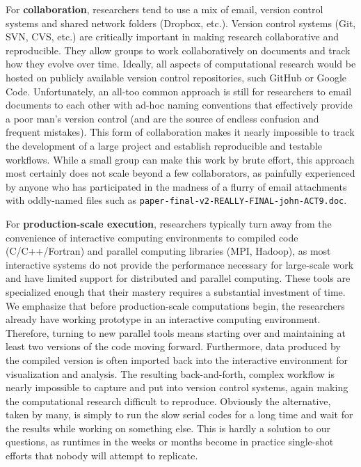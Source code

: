 \documentclass[ChapterTOCs,krantz2]{krantz} %
\begin{document}
For \textbf{collaboration}, researchers tend to use a mix of email, version
control systems and shared network folders (Dropbox, etc.).  Version control
systems (Git, SVN, CVS, etc.) are critically important in making research
collaborative and reproducible. They allow groups to work collaboratively on
documents and track how they evolve over time. Ideally, all aspects of
computational research would be hosted on publicly available version control
repositories, such GitHub or Google Code. Unfortunately, an all-too common
approach is still for researchers to email documents to each other with ad-hoc
naming conventions that effectively provide a poor man's version control (and
are the source of endless confusion and frequent mistakes). This form of
collaboration makes it nearly impossible to track the development of a large
project and establish reproducible and testable workflows.  While a small group
can make this work by brute effort, this approach most certainly does not scale
beyond a few collaborators, as painfully experienced by anyone who has
participated in the madness of a flurry of email attachments with oddly-named
files such as {\tt paper-final-v2-REALLY-FINAL-john-ACT9.doc}.

For \textbf{production-scale execution}, researchers typically turn away from
the convenience of interactive computing environments to compiled code
(C/C++/Fortran) and parallel computing libraries (MPI, Hadoop), as most
interactive systems do not provide the performance necessary for large-scale
work and have limited support for distributed and parallel computing.  These
tools are specialized enough that their mastery requires a substantial
investment of time. We emphasize that before production-scale computations
begin, the researchers already have working prototype in an interactive
computing environment. Therefore, turning to new parallel tools means starting
over and maintaining at least two versions of the code moving forward.
Furthermore, data produced by the compiled version is often imported back into
the interactive environment for visualization and analysis. The resulting
back-and-forth, complex workflow is nearly impossible to capture and put into
version control systems, again making the computational research difficult to
reproduce.  Obviously the alternative, taken by many, is simply to run the slow
serial codes for a long time and wait for the results while working on
something else.  This is hardly a solution to our questions, as runtimes in the
weeks or months become in practice single-shot efforts that nobody will attempt
to replicate.
\end{document}
